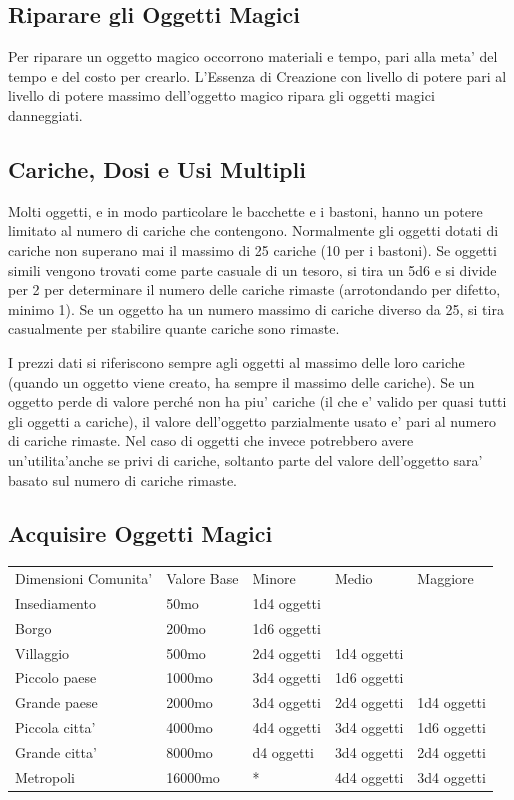 \documentclass[a4paper,11pt,twoside,openany]{dndbook}
\begin{document}
{\subsection{Riparare gli Oggetti Magici}
\label{riparare-gli-oggetti-magici}

Per riparare un oggetto magico occorrono materiali e tempo, pari alla meta' del tempo e del costo per crearlo. L'Essenza di Creazione con livello di potere pari al livello di potere massimo dell'oggetto magico ripara gli oggetti magici danneggiati.


\subsection{Cariche, Dosi e Usi Multipli}

\label{cariche-dosi-e-usi-multipli}

Molti oggetti, e in modo particolare le bacchette e i bastoni, hanno un potere limitato al numero di cariche che contengono. Normalmente gli oggetti dotati di cariche non superano mai il massimo di 25 cariche (10 per i bastoni). Se oggetti simili vengono trovati come parte casuale di un tesoro, si tira un 5d6 e si divide per 2 per determinare il numero delle cariche rimaste (arrotondando per difetto, minimo 1). Se un oggetto ha un numero massimo di cariche diverso da 25, si tira casualmente per stabilire quante cariche sono rimaste.

I prezzi dati si riferiscono sempre agli oggetti al massimo delle loro cariche (quando un oggetto viene creato, ha sempre il massimo delle cariche). Se un oggetto perde di valore perché non ha piu' cariche (il che e' valido per quasi tutti gli oggetti a cariche), il valore dell'oggetto parzialmente usato e' pari al numero di cariche rimaste. Nel caso di oggetti che invece potrebbero avere un'utilita'anche se privi di cariche, soltanto parte del valore dell'oggetto sara' basato sul numero di cariche rimaste.


\subsection{Acquisire Oggetti Magici}

\label{acquisire-oggetti-magici}

\bigskip

\begin{tabular}[c]{@{}lllll@{}}
\toprule 
Dimensioni Comunita' & Valore Base & Minore & Medio & Maggiore\tabularnewline
Insediamento & 50mo & 1d4 oggetti & & \tabularnewline
Borgo & 200mo & 1d6 oggetti & & \tabularnewline
Villaggio & 500mo & 2d4 oggetti & 1d4 oggetti & \tabularnewline
Piccolo paese & 1000mo & 3d4 oggetti & 1d6 oggetti & \tabularnewline
Grande paese & 2000mo & 3d4 oggetti & 2d4 oggetti & 1d4 oggetti\tabularnewline
Piccola citta' & 4000mo & 4d4 oggetti & 3d4 oggetti & 1d6 oggetti\tabularnewline
Grande citta' & 8000mo & d4 oggetti & 3d4 oggetti & 2d4 oggetti\tabularnewline
Metropoli & 16000mo & {*} & 4d4 oggetti & 3d4 oggetti\tabularnewline
\bottomrule
\end{tabular}

}
\end{document}
